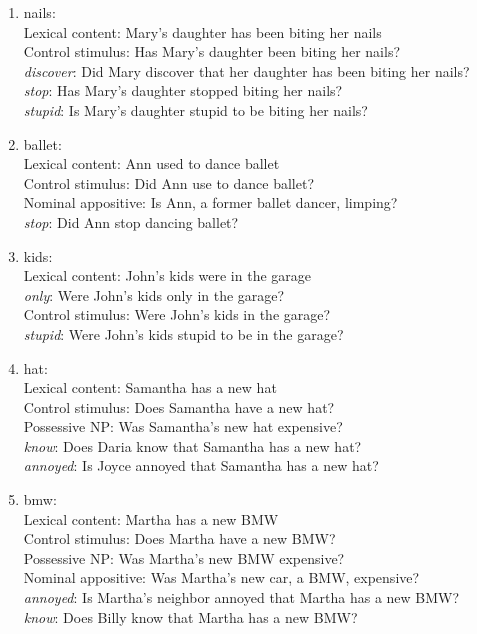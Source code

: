 \documentclass[11pt,fleqn]{article}
\newcommand{\6}{\mbox{$[\hspace*{-.6mm}[$}}
\newcommand{\9}{\mbox{$]\hspace*{-.6mm}]$}}
\begin{document}
\begin{enumerate}
\item nails:  \\
     Lexical content: Mary's daughter has been biting her nails\\
     Control stimulus: Has Mary's daughter been biting her nails?\\
     {\em discover}: Did Mary discover that her daughter has been biting her nails?\\
     {\em stop}: Has Mary's daughter stopped biting her nails?\\
     {\em stupid}: Is Mary's daughter stupid to be biting her nails?

\item  ballet:  \\
     Lexical content: Ann used to dance ballet\\
     Control stimulus: Did Ann use to dance ballet?\\
     Nominal appositive: Is Ann, a former ballet dancer, limping?\\
     {\em stop}: Did Ann stop dancing ballet?

\item kids:  \\
     Lexical content: John's kids were in the garage\\
     {\em only}: Were John's kids only in the garage?\\
     Control stimulus: Were John's kids in the garage?\\
     {\em stupid}: Were John's kids stupid to be in the garage?

\item hat:  \\
     Lexical content: Samantha has a new hat\\
     Control stimulus: Does Samantha have a new hat?\\
     Possessive NP: Was Samantha's new hat expensive?\\
     {\em know}: Does Daria know that Samantha has a new hat?\\
     {\em annoyed}: Is Joyce annoyed that Samantha has a new hat?

\item bmw:  \\
     Lexical content: Martha has a new BMW\\
     Control stimulus: Does Martha have a new BMW?\\
     Possessive NP: Was Martha's new BMW expensive?\\
     Nominal appositive: Was Martha's new car, a BMW, expensive?\\
     {\em annoyed}: Is Martha's neighbor annoyed that Martha has a new BMW?\\
     {\em know}: Does Billy know that Martha has a new BMW?


\end{enumerate}
\end{document}
